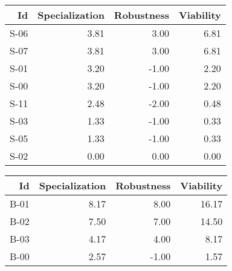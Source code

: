 


\begin{tabular}{ | r | r | r | r | }
    \hline
                    Id  &  Specialization  &      Robustness  &       Viability  \\
    \hline
    \hline
                  S-06  &            3.81  &            3.00  &            6.81  \\
    \hline
                  S-07  &            3.81  &            3.00  &            6.81  \\
    \hline
                  S-01  &            3.20  &           -1.00  &            2.20  \\
    \hline
                  S-00  &            3.20  &           -1.00  &            2.20  \\
    \hline
                  S-11  &            2.48  &           -2.00  &            0.48  \\
    \hline
                  S-03  &            1.33  &           -1.00  &            0.33  \\
    \hline
                  S-05  &            1.33  &           -1.00  &            0.33  \\
    \hline
                  S-02  &            0.00  &            0.00  &            0.00  \\
    \hline
\end{tabular}


\begin{tabular}{ | r | r | r | r | }
    \hline
                    Id  &  Specialization  &      Robustness  &       Viability  \\
    \hline
    \hline
                  B-01  &            8.17  &            8.00  &           16.17  \\
    \hline
                  B-02  &            7.50  &            7.00  &           14.50  \\
    \hline
                  B-03  &            4.17  &            4.00  &            8.17  \\
    \hline
                  B-00  &            2.57  &           -1.00  &            1.57  \\
    \hline
\end{tabular}


